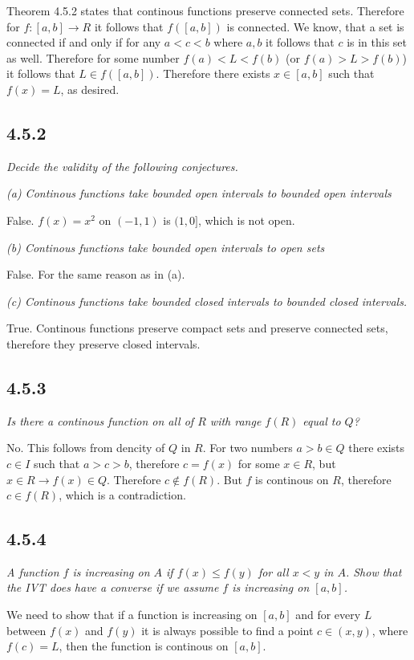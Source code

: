 \documentclass[11pt,oneside,titlepage]{book}
\begin{document}
Theorem 4.5.2 states that continous functions preserve connected sets.
Therefore for $f: [a, b] \to  R$ it follows that
$f([a, b])$ is connected. We know, that a set is connected if and only if
for any $a < c < b$ where $a, b$ it follows that $c$ is in this set as well.
Therefore for some number $f(a) < L < f(b)$ (or $f(a) > L > f(b)$) it follows
that $L \in f([a, b])$. Therefore there exists $x \in [a, b]$ such that
$f(x) = L$, as desired.

\subsection*{4.5.2}
\textit{Decide the validity of the following conjectures.}

\textit{(a) Continous functions take bounded open intervals to bounded open
  intervals }

False. $f(x) = x^2$ on $(-1, 1)$ is $(1, 0]$, which is not open.

\textit{(b) Continous functions take bounded open intervals to open sets }

False. For the same reason as in (a).

\textit{(c) Continous functions take bounded closed intervals to bounded
  closed intervals.}

True. Continous functions preserve compact sets and preserve connected
sets, therefore they preserve closed intervals.

\subsection*{4.5.3}
\textit{Is there a continous function on all of $R$ with range $f(R)$ equal
  to $Q$?}

No. This follows from dencity of $Q$ in $R$. For two numbers $a > b \in Q$
there exists $c \in I$ such that $a > c > b$, therefore 
$c = f(x)$ for some $x \in R$, but $x \in R \to f(x) \in Q$. Therefore
$c \notin f(R)$. But $f$ is continous on $R$, therefore $c \in f(R)$, which is
a contradiction.

\subsection*{4.5.4}
\textit{A function $f$ is increasing on $A$ if $f(x) \leq f(y)$ for all
  $x < y$ in $A$. Show that the IVT does have a converse if we assume $f$ is
  increasing on $[a, b]$.}

We need to show that if a function is increasing on $[a, b]$
and for every  $L$  between $f(x)$ and $f(y)$ it is always possible to find
a point $c \in (x, y)$, where $f(c) = L$, then the function is continous
on $[a, b]$.
\end{document}
